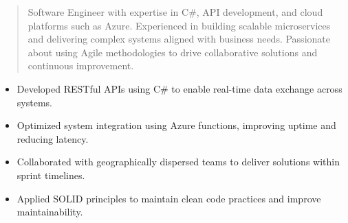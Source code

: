 



\makecvheader

\begin{quote}
  \noindent
  Software Engineer with expertise in C#, API development, and cloud platforms such as Azure. Experienced in building scalable microservices and delivering complex systems aligned with business needs. Passionate about using Agile methodologies to drive collaborative solutions and continuous improvement.
\end{quote}

\par\smallskip
\noindent
\begin{minipage}{20cm}
  \begin{minipage}{9.75cm}
    \begin{itemize}
      \item Developed RESTful APIs using C# to enable real-time data exchange across systems.
      \item Optimized system integration using Azure functions, improving uptime and reducing latency.
    \end{itemize}
  \end{minipage}
  \hfill
  \begin{minipage}{9.75cm}
    \begin{itemize}
      \item Collaborated with geographically dispersed teams to deliver solutions within sprint timelines.
      \item Applied SOLID principles to maintain clean code practices and improve maintainability.
    \end{itemize}
  \end{minipage}
\end{minipage}
\par\smallskip
\divider

